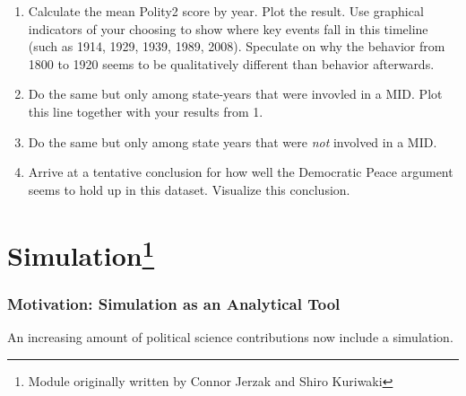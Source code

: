 \documentclass[
]{book}
\providecommand{\tightlist}{%
  \setlength{\itemsep}{0pt}\setlength{\parskip}{0pt}}
\theoremstyle{definition}
\theoremstyle{definition}
\theoremstyle{definition}
\theoremstyle{remark}
\begin{document}
\begin{enumerate}
\def\labelenumi{\arabic{enumi}.}
\tightlist
\item
  Calculate the mean Polity2 score by year. Plot the result. Use graphical indicators of your choosing to show where key events fall in this timeline (such as 1914, 1929, 1939, 1989, 2008). Speculate on why the behavior from 1800 to 1920 seems to be qualitatively different than behavior afterwards.
\item
  Do the same but only among state-years that were invovled in a MID. Plot this line together with your results from 1.
\item
  Do the same but only among state years that were \emph{not} involved in a MID.
\item
  Arrive at a tentative conclusion for how well the Democratic Peace argument seems to hold up in this dataset. Visualize this conclusion.
\end{enumerate}

\hypertarget{simulation}{%
\chapter[Simulation]{\texorpdfstring{Simulation\footnote{Module originally written by Connor Jerzak and Shiro Kuriwaki}}{Simulation}}\label{simulation}}

\hypertarget{motivation-simulation-as-an-analytical-tool}{%
\subsection*{Motivation: Simulation as an Analytical Tool}\label{motivation-simulation-as-an-analytical-tool}}

An increasing amount of political science contributions now include a simulation.
\end{document}
